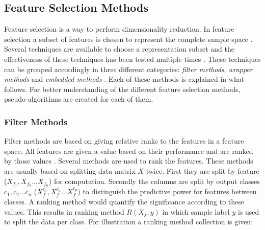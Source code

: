 \documentclass[10pt,a4paper]{report}
\begin{document}
	\subsection{Feature Selection Methods}
	\label{FSsubsec:FeatureSelectionMethods}
	
	Feature selection is a way to perform dimensionality reduction. In feature selection a subset of features is chosen to represent the complete sample space \cite{Guyon2006}. Several techniques are available to choose a representation subset and the effectiveness of these techniques has been tested multiple times \cite{CATAL20091040, molina2002feature}. These techniques can be grouped accordingly in three different categories: \textit{filter methods}, \textit{wrapper methods} and \textit{embedded methods} \cite{saeys2007review}. Each of these methods is explained in what follows. For better understanding of the different feature selection methods, pseudo-algorithms are created for each of them.

	\subsubsection{Filter Methods}
	\label{FSsubsec:FilterMethods}
	
	Filter methods are based on giving relative ranks to the features in a feature space. All features are given a value based on their performance and are ranked by those values \cite{Duch2006, saeys2007review}. Several methods are used to rank the features. These methods are usually based on splitting data matrix $X$ twice. First they are split by feature ($X_{f_1}, X_{f_2} ... X_{f_n}$) for computation. Secondly the columns are split by output classes $c_1, c_2 ... c_n$ ($X_{f}^{c_1}, X_{f}^{c_2} ... X_{f}^{c_p}$) to distinguish the predictive power for features between classes. A ranking method would quantify the significance according to these values. This results in ranking method $R(X_f, y)$ in which sample label $y$ is used to split the data per class. For illustration a ranking method collection is given:
	
\end{document}
